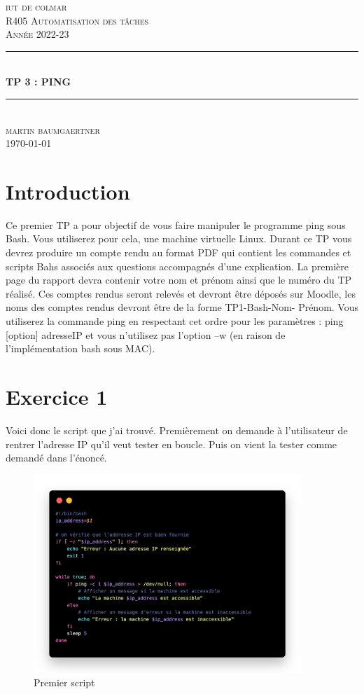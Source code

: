 \documentclass[12pt, a4paper]{article}
\begin{document}
\begin{titlepage}
	\newcommand{\HRule}{\rule{\linewidth}{0.5mm}} 
	\center 
	\textsc{\LARGE iut de colmar}\\[6.5cm] 
	\textsc{\Large R405 Automatisation des tâches}\\[0.5cm] 
	\textsc{\large Année 2022-23}\\[0.5cm]
	\HRule\\[0.75cm]
	{\huge\bfseries TP 3 : PING}\\[0.4cm]
	\HRule\\[1.5cm]
	\textsc{\large martin baumgaertner}\\[6.5cm] 

	\vfill\vfill\vfill
	{\large\today} 
	\vfill
\end{titlepage}
\newpage
\tableofcontents
\newpage
\section{Introduction}
Ce premier TP a pour objectif de vous faire manipuler le programme ping sous 
Bash. Vous utiliserez pour cela, une machine virtuelle Linux. Durant ce TP 
vous devrez produire un compte rendu au format PDF qui contient les commandes 
et scripts Bahs associés aux questions accompagnés d’une explication. La 
première page du rapport devra contenir votre nom et prénom ainsi que le 
numéro du TP réalisé. Ces comptes rendus seront relevés et devront être 
déposés sur Moodle, les noms des comptes rendus devront être de la forme 
TP1-Bash-Nom- Prénom. Vous utiliserez la commande ping en respectant cet 
ordre pour les paramètres : ping [option] adresseIP et vous n’utilisez pas 
l’option –w (en raison de l’implémentation bash sous MAC).

\section{Exercice 1}

Voici donc le script que j'ai trouvé. Premièrement on demande à l'utilisateur de rentrer
l'adresse IP qu'il veut tester en boucle. Puis on vient la tester comme demandé dans l'énoncé.
\begin{figure}[h]
    \centering
    \includegraphics[width=0.9\textwidth]{img/code1.png}
    \caption{Premier script}
    \label{fig:script1}
\end{figure}\\
\end{document}
